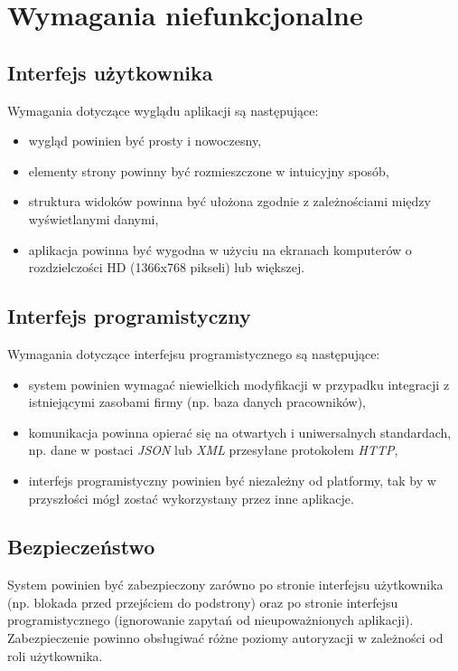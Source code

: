 \documentclass[eng,printmode,openany]{mgr}
\begin{document}
	\section{Wymagania niefunkcjonalne}
	\subsection{Interfejs użytkownika}
	Wymagania dotyczące wyglądu aplikacji są następujące:
	\begin{itemize}
		\item wygląd powinien być prosty i nowoczesny,
		\item elementy strony powinny być rozmieszczone w intuicyjny sposób,
		\item struktura widoków powinna być ułożona zgodnie z zależnościami między wyświetlanymi danymi,
		\item aplikacja powinna być wygodna w użyciu na ekranach komputerów o rozdzielczości HD (1366x768 pikseli) lub większej.
	\end{itemize}
	\newpage
	\subsection{Interfejs programistyczny}
	Wymagania dotyczące interfejsu programistycznego są następujące:
	\begin{itemize}
		\item system powinien wymagać niewielkich modyfikacji w przypadku integracji z istniejącymi zasobami firmy (np. baza danych pracowników),
		\item komunikacja powinna opierać się na otwartych i uniwersalnych standardach, np. dane w postaci \textit{JSON} lub \textit{XML} przesyłane protokołem \textit{HTTP},
		\item interfejs programistyczny powinien być niezależny od platformy, tak by w przyszłości mógł zostać wykorzystany przez inne aplikacje.
	\end{itemize}
	\subsection{Bezpieczeństwo}
	System powinien być zabezpieczony zarówno po stronie interfejsu użytkownika (np. blokada przed przejściem do podstrony) oraz po stronie interfejsu programistycznego (ignorowanie zapytań od nieupoważnionych aplikacji). Zabezpieczenie powinno obsługiwać różne poziomy autoryzacji w zależności od roli użytkownika.
	
	\newpage
\end{document}
